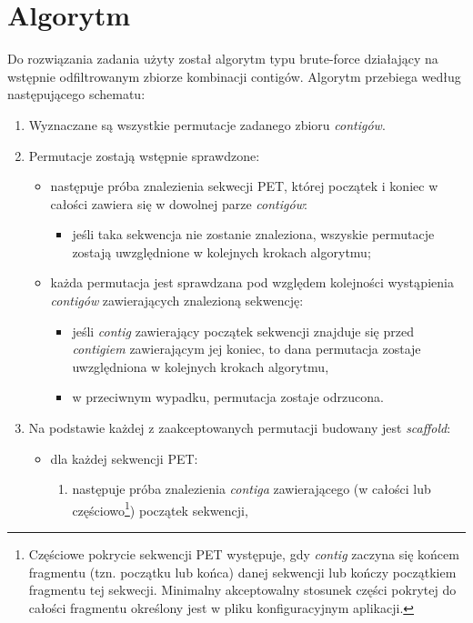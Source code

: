 \documentclass[a4paper,10pt]{article}
\begin{document}
\section*{Algorytm}

Do rozwiązania zadania użyty został algorytm typu brute-force działający na wstępnie odfiltrowanym zbiorze kombinacji contigów.
Algorytm przebiega według następującego schematu:

\begin{enumerate}
 \item \label{step1} Wyznaczane są wszystkie permutacje zadanego zbioru \emph{contigów}.
 \item \label{step2} Permutacje zostają wstępnie sprawdzone:
  \begin{itemize}
   \item następuje próba znalezienia sekwecji PET, której początek i koniec w całości zawiera się w dowolnej parze \emph{contigów}:
    \begin{itemize}
     \item jeśli taka sekwencja nie zostanie znaleziona, wszyskie permutacje zostają uwzględnione w kolejnych krokach algorytmu;
    \end{itemize}
   \item każda permutacja jest sprawdzana pod względem kolejności wystąpienia \emph{contigów} zawierających znalezioną sekwencję:
    \begin{itemize}
     \item jeśli \emph{contig} zawierający początek sekwencji znajduje się przed \emph{contigiem} zawierającym jej koniec, to dana permutacja zostaje uwzględniona w kolejnych krokach algorytmu,
     \item w przeciwnym wypadku, permutacja zostaje odrzucona.
    \end{itemize}
  \end{itemize}
 \item \label{step3} Na podstawie każdej z zaakceptowanych permutacji budowany jest \emph{scaffold}:
  \begin{itemize}
   \item dla każdej sekwencji PET:
    \begin{enumerate}
     \item \label{step3_1} następuje próba znalezienia \emph{contiga} zawierającego (w całości lub częściowo\footnote{Częściowe pokrycie sekwencji PET występuje, gdy \emph{contig} zaczyna się końcem fragmentu (tzn. początku lub końca) danej sekwencji lub kończy początkiem fragmentu tej sekwecji. Minimalny akceptowalny stosunek części pokrytej do całości fragmentu określony jest w pliku konfiguracyjnym aplikacji.}) początek sekwencji,

\end{enumerate}
\end{itemize}
\end{enumerate}
\end{document}
